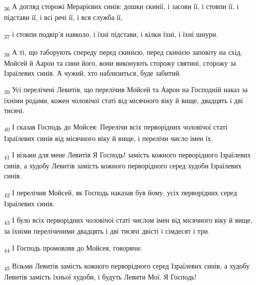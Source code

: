 \begin{tcolorbox}
\textsubscript{36} А догляд сторожі Мерарієвих синів: дошки скинії, і засови її, і стовпи її, і підстави її, і всі речі її, і вся служба її,
\end{tcolorbox}
\begin{tcolorbox}
\textsubscript{37} і стовпи подвір'я навколо, і їхні підстави, і кілки їхні, і їхні шнури.
\end{tcolorbox}
\begin{tcolorbox}
\textsubscript{38} А ті, що таборують спереду перед скинією, перед скинією заповіту на схід, Мойсей й Аарон та сини його, вони виконують сторожу святині, сторожу за Ізраїлевих синів. А чужий, хто наблизиться, буде забитий.
\end{tcolorbox}
\begin{tcolorbox}
\textsubscript{39} Усі перелічені Левитів, що перелічив Мойсей та Аарон на Господній наказ за їхніми родами, кожен чоловічої статі від місячного віку й вище, двадцять і дві тисячі.
\end{tcolorbox}
\begin{tcolorbox}
\textsubscript{40} І сказав Господь до Мойсея: Перелічи всіх перворідних чоловічої статі Ізраїлевих синів від місячного віку й вище, і перелічи число імен їх.
\end{tcolorbox}
\begin{tcolorbox}
\textsubscript{41} І візьми для мене Левитів Я Господь! замість кожного перворідного Ізраїлевих синів, а худобу Левитів замість кожного перворідного серед худоби Ізраїлевих синів.
\end{tcolorbox}
\begin{tcolorbox}
\textsubscript{42} І перелічив Мойсей, як Господь наказав був йому, усіх перворідних серед Ізраїлевих синів.
\end{tcolorbox}
\begin{tcolorbox}
\textsubscript{43} І було всіх перворідних чоловічої статі числом імен від місячного віку й вище, за їхніми переліченими двадцять і дві тисячі двісті і сімдесят і три.
\end{tcolorbox}
\begin{tcolorbox}
\textsubscript{44} І Господь промовляв до Мойсея, говорячи:
\end{tcolorbox}
\begin{tcolorbox}
\textsubscript{45} Візьми Левитів замість кожного перворідного серед Ізраїлевих синів, а худобу Левитів замість їхньої худоби, і будуть Левити Мої. Я Господь!
\end{tcolorbox}
